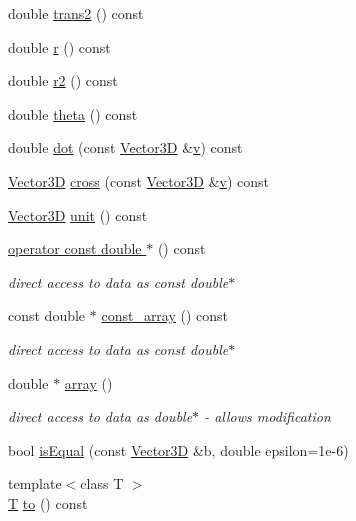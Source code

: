 \begin{DoxyCompactItemize}
double \hyperlink{class_d_d_surfaces_1_1_vector3_d_ad75dc7ab2c8736088a6a5ae92034cfbb}{trans2} () const
\item 
double \hyperlink{class_d_d_surfaces_1_1_vector3_d_af9101fe5b09d3db799f0231802c493d2}{r} () const
\item 
double \hyperlink{class_d_d_surfaces_1_1_vector3_d_a94f8d2cbaced43db5641954ac028356d}{r2} () const
\item 
double \hyperlink{class_d_d_surfaces_1_1_vector3_d_ae775f1d9753bde89f04ec1326f62cbab}{theta} () const
\item 
double \hyperlink{class_d_d_surfaces_1_1_vector3_d_a64ee4440f001b2f4208a52545872b8f6}{dot} (const \hyperlink{class_d_d_surfaces_1_1_vector3_d}{Vector3D} \&\hyperlink{_multi_view_8cpp_a8320ee13ac034dbf6d624fe8953dd337}{v}) const
\item 
\hyperlink{class_d_d_surfaces_1_1_vector3_d}{Vector3D} \hyperlink{class_d_d_surfaces_1_1_vector3_d_a4e6fdf17cbe2d7e557a2e6a4b77063fe}{cross} (const \hyperlink{class_d_d_surfaces_1_1_vector3_d}{Vector3D} \&\hyperlink{_multi_view_8cpp_a8320ee13ac034dbf6d624fe8953dd337}{v}) const
\item 
\hyperlink{class_d_d_surfaces_1_1_vector3_d}{Vector3D} \hyperlink{class_d_d_surfaces_1_1_vector3_d_a165238feeb43caeeddb4c1710212610d}{unit} () const
\item 
\hyperlink{class_d_d_surfaces_1_1_vector3_d_a67ce1d55b6eaa7f0598f1388b7e9d065}{operator const double $\ast$} () const
\begin{DoxyCompactList}\small\item\em direct access to data as const double$\ast$ \end{DoxyCompactList}\item 
const double $\ast$ \hyperlink{class_d_d_surfaces_1_1_vector3_d_aee6b48baf83b171ba269b05eae47edd9}{const\+\_\+array} () const
\begin{DoxyCompactList}\small\item\em direct access to data as const double$\ast$ \end{DoxyCompactList}\item 
double $\ast$ \hyperlink{class_d_d_surfaces_1_1_vector3_d_a467bf79fd3e74223a070ecc612d54526}{array} ()
\begin{DoxyCompactList}\small\item\em direct access to data as double$\ast$ -\/ allows modification \end{DoxyCompactList}\item 
bool \hyperlink{class_d_d_surfaces_1_1_vector3_d_af6ffa436fc2d34bb4485b5a4a18d008e}{is\+Equal} (const \hyperlink{class_d_d_surfaces_1_1_vector3_d}{Vector3D} \&b, double epsilon=1e-\/6)
\item 
{\footnotesize template$<$class T $>$ }\\\hyperlink{class_t}{T} \hyperlink{class_d_d_surfaces_1_1_vector3_d_adca3092fab234dc0d929ef8c24b0eef6}{to} () const
\end{DoxyCompactItemize}
